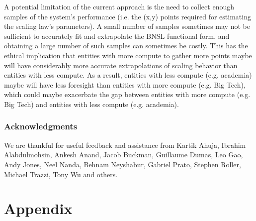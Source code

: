 \documentclass{article} %
\begin{document}
\vspace{-0.7225mm}

A potential limitation of the current approach is the need to collect enough samples of the system’s performance (i.e. the (x,y) points required for estimating the scaling law's parameters). A small number of samples sometimes may not be sufficient to accurately fit and extrapolate the BNSL functional form, and obtaining a large number of such samples can sometimes be costly. This has the ethical implication that entities with more compute to gather more points maybe will have considerably more accurate extrapolations of scaling behavior than entities with less compute. As a result, entities with less compute (e.g. academia) maybe will have less foresight than entities with more compute (e.g. Big Tech), which could maybe exacerbate the gap between entities with more compute (e.g. Big Tech) and entities with less compute (e.g. academia).

\vspace{-1.55mm}
\subsubsection*{Acknowledgments}
\vspace{-1.15mm}
We are thankful for useful feedback and assistance from Kartik Ahuja, Ibrahim Alabdulmohsin, Ankesh Anand, Jacob Buckman, Guillaume Dumas, Leo Gao, Andy Jones, Neel Nanda, Behnam Neyshabur, Gabriel Prato, Stephen Roller, Michael Trazzi, Tony Wu and others.


\newpage




\clearpage 
\appendix
%
\section{Appendix}
\end{document}
